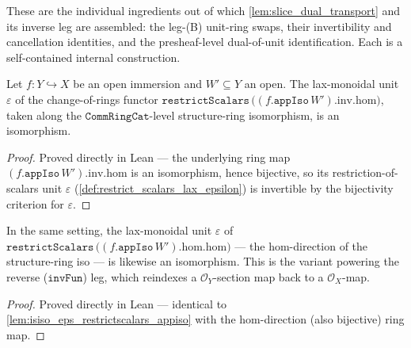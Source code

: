 These are the individual ingredients out of which \cref{lem:slice_dual_transport} and its
inverse leg are assembled: the leg-(B) unit-ring swaps, their invertibility and cancellation
identities, and the presheaf-level dual-of-unit identification. Each is a self-contained
internal construction.

\begin{lemma}\leanok
  \label{lem:isiso_eps_restrictscalars_appiso}
  Let \(f : Y \hookrightarrow X\) be an open immersion and \(W' \subseteq Y\) an open. The
  lax-monoidal unit \(\varepsilon\) of the change-of-rings functor
  \(\mathtt{restrictScalars}\,\bigl((f.\mathtt{appIso}\,W').\mathrm{inv}.\mathrm{hom}\bigr)\),
  taken along the \(\mathtt{CommRingCat}\)-level structure-ring isomorphism, is an
  isomorphism.
\end{lemma}
\begin{proof}
  \leanok
  Proved directly in Lean --- the underlying ring map
  \((f.\mathtt{appIso}\,W').\mathrm{inv}.\mathrm{hom}\) is an isomorphism, hence bijective, so
  its restriction-of-scalars unit \(\varepsilon\) (\cref{def:restrict_scalars_lax_epsilon}) is
  invertible by the bijectivity criterion for \(\varepsilon\).
\end{proof}

\begin{lemma}\leanok
  \label{lem:isiso_eps_restrictscalars_appiso_hom}
  In the same setting, the lax-monoidal unit \(\varepsilon\) of
  \(\mathtt{restrictScalars}\,\bigl((f.\mathtt{appIso}\,W').\mathrm{hom}.\mathrm{hom}\bigr)\)
  --- the \(\mathrm{hom}\)-direction of the structure-ring iso --- is likewise an
  isomorphism. This is the variant powering the reverse (\(\mathtt{invFun}\)) leg, which
  reindexes a \(\mathcal{O}_Y\)-section map back to a \(\mathcal{O}_X\)-map.
\end{lemma}
\begin{proof}
  \leanok
  Proved directly in Lean --- identical to \cref{lem:isiso_eps_restrictscalars_appiso} with
  the \(\mathrm{hom}\)-direction (also bijective) ring map.
\end{proof}

